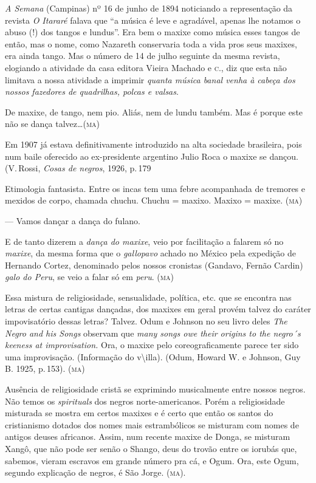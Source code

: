 \textit{A Semana} (Campinas) nº 16 de junho de 1894 noticiando a
representação da revista \textit{O Itararé} falava que ``a música é leve e
agradável, apenas lhe notamos o abuso (!) dos tangos e lundus''. Era bem
o maxixe como música esses tangos de então, mas o nome, como Nazareth
conservaria toda a vida pros seus maxixes, era ainda tango. Mas o número
de 14 de julho seguinte da mesma revista, elogiando a atividade da casa
editora Vieira Machado e \textsc{c}., diz que esta não limitava a nossa atividade
a imprimir \textit{quanta música banal venha à cabeça dos nossos fazedores de
quadrilhas, polcas e valsas}.

De maxixe, de tango, nem pio. Aliás, nem de lundu também. Mas é porque
este não se dança talvez\ldots{}(\textsc{ma})

Em 1907 já estava definitivamente introduzido na alta sociedade
brasileira, pois num baile oferecido ao ex-presidente argentino Julio
Roca o maxixe se dançou. (V.\,Rossi, \emph{Cosas de negros}, 1926, p.\,179

Etimologia fantasista. Entre os incas tem uma febre acompanhada de
tremores e mexidos de corpo, chamada chuchu. Chuchu = maxixo. Maxixo =
maxixe. (\textsc{ma})

--- Vamos dançar a dança do fulano.

E de tanto dizerem a \textit{dança do maxixe}, veio por facilitação a falarem
só no \textit{maxixe}, da mesma forma que o \textit{gallopavo} achado no México pela
expedição de Hernando Cortez, denominado pelos nossos cronistas
(Gandavo, Fernão Cardin) \textit{galo do Peru}, se veio a falar só em \textit{peru}. (\textsc{ma})

Essa mistura de religiosidade, sensualidade, política, etc. que se
encontra nas letras de certas cantigas dançadas, dos maxixes em geral
provém talvez do caráter impovisatório dessas letras? Talvez. Odum e
Johnson no seu livro deles \emph{The Negro and his Songs} observam que
\textit{many songs owe their origins to the negro´s keeness at improvisation.}
Ora, o maxixe pelo coreograficamente parece ter sido uma improvisação.
(Informação do v\textbackslash{}illa). (Odum, Howard W. e Johnson, Guy
B. 1925, p.\,153). (\textsc{ma})

Ausência de religiosidade cristã se exprimindo musicalmente entre nossos
negros. Não temos os \textit{spirituals} dos negros norte-americanos. Porém a
religiosidade misturada se mostra em certos maxixes e é certo que então
os santos do cristianismo dotados dos nomes mais estrambólicos se
misturam com nomes de antigos deuses africanos. Assim, num recente maxixe
de Donga, se misturam Xangô, que não pode ser senão o Shango, deus do
trovão entre os iorubás que, sabemos, vieram escravos em grande número pra
cá, e Ogum. Ora, este Ogum, segundo explicação de negros, é São Jorge. (\textsc{ma}).

